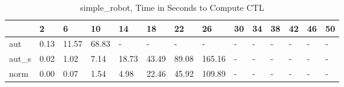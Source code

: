 \begin{table}
\caption{simple_robot, Time in Seconds to Compute CTL}
\label{simple_robot_CTL_time}
\begin{tabular}{llllllllllllll}
\toprule
 & 2 & 6 & 10 & 14 & 18 & 22 & 26 & 30 & 34 & 38 & 42 & 46 & 50 \\
\midrule
aut & 0.13 & 11.57 & 68.83 & - & - & - & - & - & - & - & - & - & - \\
aut_s & 0.02 & 1.02 & 7.14 & 18.73 & 43.49 & 89.08 & 165.16 & - & - & - & - & - & - \\
norm & 0.00 & 0.07 & 1.54 & 4.98 & 22.46 & 45.92 & 109.89 & - & - & - & - & - & - \\
\bottomrule
\end{tabular}
\end{table}
